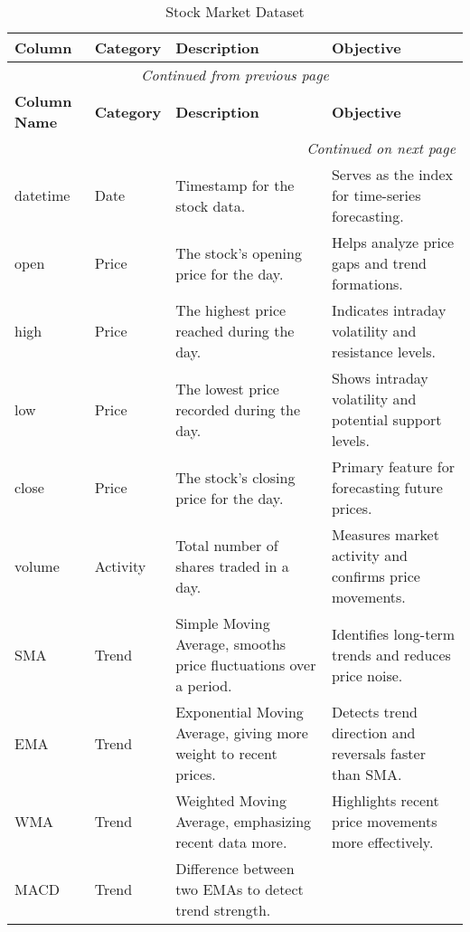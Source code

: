 \begin{longtable}{llp{5cm}p{5cm}}
    \caption{Stock Market Dataset}\label{tab:dataset_structure} \\
    \hline
    \textbf{Column} & \textbf{Category} & \textbf{Description} & \textbf{Objective}  \\
    \hline
    \endfirsthead

    \multicolumn{4}{c}{\textit{Continued from previous page}} \\
    \hline
    \textbf{Column Name} & \textbf{Category} & \textbf{Description} & \textbf{Objective} \\
    \hline
    \endhead

    \hline \multicolumn{4}{r}{\textit{Continued on next page}} \\
    \endfoot

    \hline
    \endlastfoot
        datetime & Date 
        & Timestamp for the stock data. 
        & Serves as the index for time-series forecasting. \\
        open & Price 
        & The stock's opening price for the day. 
        & Helps analyze price gaps and trend formations. \\
        high & Price 
        & The highest price reached during the day. 
        & Indicates intraday volatility and resistance levels. \\
        low & Price 
        & The lowest price recorded during the day. 
        & Shows intraday volatility and potential support levels. \\
        close & Price 
        & The stock's closing price for the day. & Primary feature for forecasting future prices. \\
        volume & Activity 
        & Total number of shares traded in a day. 
        & Measures market activity and confirms price movements. \\
        SMA & Trend 
        & Simple Moving Average, smooths price fluctuations over a period. 
        & Identifies long-term trends and reduces price noise. \\
        EMA & Trend 
        & Exponential Moving Average, giving more weight to recent prices. 
        & Detects trend direction and reversals faster than SMA. \\
        WMA & Trend 
        & Weighted Moving Average, emphasizing recent data more. 
        & Highlights recent price movements more effectively. \\
        MACD & Trend 
        & Difference between two EMAs to detect trend strength. 

\end{longtable}
